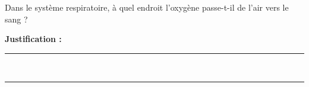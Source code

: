 Dans le système respiratoire, à quel endroit l'oxygène passe-t-il de l'air vers le sang ?

\choices

\noindent\textbf{Justification :} \hrulefill \\[2.5ex]
\rule{\linewidth}{0.4pt} \\[2.5ex]
\rule{\linewidth}{0.4pt}
\vfill
